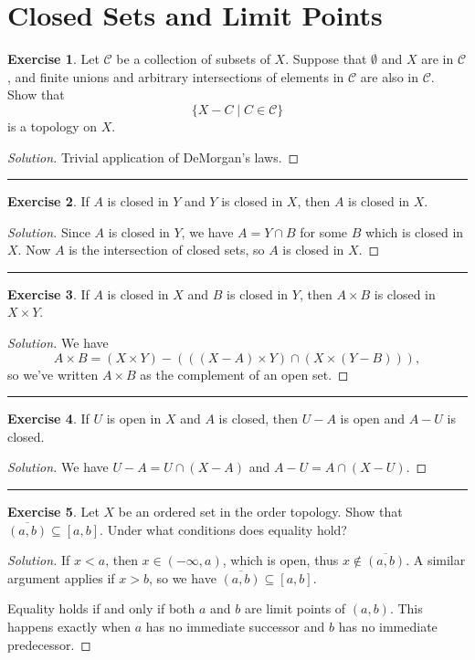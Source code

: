 \documentclass{article}
\theoremstyle{definition}
\newtheorem{exercise}{Exercise}[section]
\begin{document}
\addtocounter{section}{16}
\section{Closed Sets and Limit Points}

\begin{exercise}
  Let $\mathcal{C}$ be a collection of subsets of $X$. Suppose that $\emptyset$ and $X$ are in $\mathcal{C}$, and finite unions and arbitrary intersections of elements in $\mathcal{C}$ are also in $\mathcal{C}$. Show that
  $$\{X - C\mid C\in\mathcal{C}\}$$
  is a topology on $X$.
\end{exercise}
\begin{proof}[Solution]
  Trivial application of DeMorgan's laws.
\end{proof}

\hrule

\begin{exercise}
  If $A$ is closed in $Y$ and $Y$ is closed in $X$, then $A$ is closed in $X$.
\end{exercise}
\begin{proof}[Solution]
  Since $A$ is closed in $Y$, we have $A = Y\cap B$ for some $B$ which is closed in $X$. Now $A$ is the intersection of closed sets, so $A$ is closed in $X$.
\end{proof}

\hrule

\begin{exercise}
  If $A$ is closed in $X$ and $B$ is closed in $Y$, then $A\times B$ is closed in $X\times Y$.
\end{exercise}
\begin{proof}[Solution]
  We have
  $$A\times B = (X\times Y) - (((X-A)\times Y) \cap (X\times (Y-B))),$$
  so we've written $A\times B$ as the complement of an open set.
\end{proof}

\hrule

\begin{exercise}
  If $U$ is open in $X$ and $A$ is closed, then $U - A$ is open and $A - U$ is closed.
\end{exercise}
\begin{proof}[Solution]
  We have $U - A = U\cap (X - A)$ and $A - U = A\cap (X - U)$.
\end{proof}

\hrule

\begin{exercise}
  Let $X$ be an ordered set in the order topology. Show that $\overline{(a,b)}\subseteq [a,b]$. Under what conditions does equality hold?
\end{exercise}
\begin{proof}[Solution]
  If $x < a$, then $x\in (-\infty,a)$, which is open, thus $x\notin\overline{(a,b)}$. A similar argument applies if $x > b$, so we have $\overline{(a,b)}\subseteq[a,b]$.

  Equality holds if and only if both $a$ and $b$ are limit points of $(a,b)$. This happens exactly when $a$ has no immediate successor and $b$ has no immediate predecessor.
\end{proof}
\end{document}
